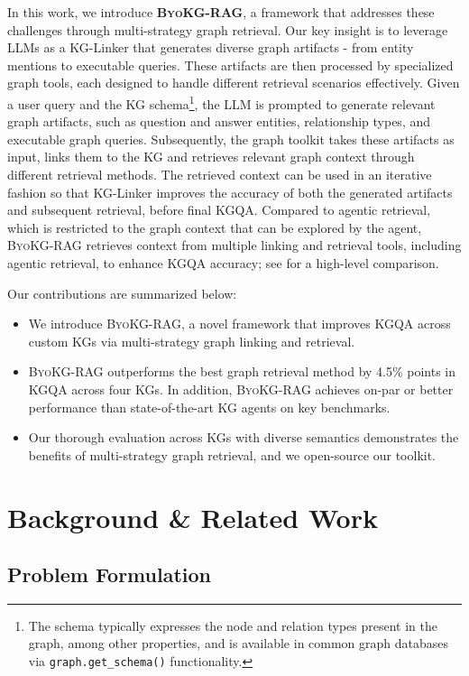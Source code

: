 \documentclass[11pt]{article}
\newcommand{\byokg}{\textsc{ByoKG-RAG}\xspace}
\newcommand{\glink}{KG-Linker\xspace}
\begin{document}
In this work, we introduce \textbf{\byokg}, a framework that addresses these challenges through multi-strategy graph retrieval. Our key insight is to leverage LLMs as a \glink that generates diverse graph artifacts - from entity mentions to executable queries. These artifacts are then processed by specialized graph tools, each designed to handle different retrieval scenarios effectively.
Given a user query and the  KG schema\footnote{The schema typically expresses the node and relation types present in the graph, among other properties, and is available in common graph databases via \texttt{graph.get\_schema()} functionality.}, the LLM is prompted to generate relevant graph artifacts, such as question and answer entities, relationship types, and executable graph queries. Subsequently, the graph toolkit takes these artifacts as input, links them to the KG and retrieves relevant graph context through  different retrieval methods. The retrieved context can be used in an iterative fashion so that \glink improves the accuracy of both the generated artifacts and subsequent retrieval, before final KGQA.
Compared to agentic retrieval, which is restricted to the graph context that can be explored by the agent, \byokg retrieves context from multiple linking and retrieval tools, including agentic retrieval, to enhance KGQA accuracy; see  for a high-level comparison.  

Our contributions are summarized below:
\begin{itemize}
    \item We introduce \byokg, a novel framework that improves KGQA across custom KGs via multi-strategy graph linking and retrieval. 
    \item \byokg outperforms the best graph retrieval method by 4.5\% points in KGQA across four KGs. In addition, \byokg achieves on-par or better performance than state-of-the-art KG agents on key benchmarks. 
    \item Our thorough evaluation across KGs with diverse semantics demonstrates the benefits of multi-strategy graph retrieval, and we open-source our toolkit.
    
\end{itemize}



\section{Background \& Related Work}


\subsection{Problem Formulation}
\end{document}

